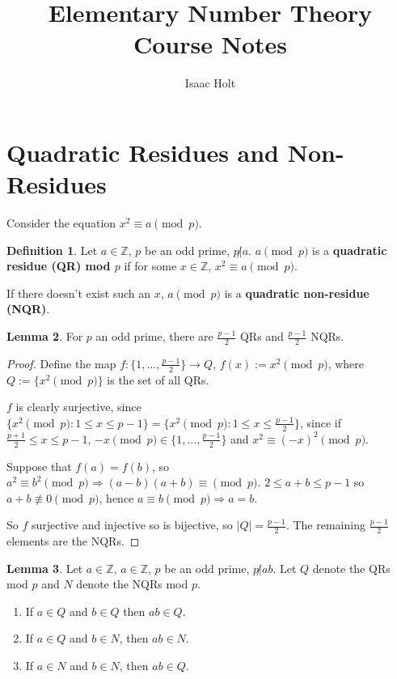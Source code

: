 \documentclass[12pt,a4paper]{article}
\title{Elementary Number Theory Course Notes}
\author{Isaac Holt}
\theoremstyle{definition}
\newtheorem{definition}{Definition}[subsection]
\newtheorem{lemma}[definition]{Lemma}
\begin{document}
\maketitle

\section{Quadratic Residues and Non-Residues}

Consider the equation $x^2 \equiv a \pmod{p}$.

\begin{definition}
	Let $a \in \mathbb{Z}$, $p$ be an odd prime, $p \not | a$. $a \pmod{p}$ is a \textbf{quadratic residue (QR) mod $p$} if for some $x \in \mathbb{Z}$, $x^2 \equiv a \pmod{p}$.

	If there doesn't exist such an $x$, $a \pmod{p}$ is a \textbf{quadratic non-residue (NQR)}.
\end{definition}

\begin{lemma}
	For $p$ an odd prime, there are $\frac{p - 1}{2}$ QRs and $\frac{p - 1}{2}$ NQRs.
\end{lemma}

\begin{proof}
	Define the map $f: \{1, \dots, \frac{p - 1}{2}\} \rightarrow Q$, $f(x) := x^2 \pmod{p}$, where $Q := \{x^2 \pmod{p}\}$ is the set of all QRs.

	$f$ is clearly surjective, since $\{x^2 \pmod{p}: 1 \le x \le p - 1\} = \{x^2 \pmod{p}: 1 \le x \le \frac{p - 1}{2}\}$, since if $\frac{p + 1}{2} \le x \le p - 1$, $-x \pmod{p} \in \{1, \dots, \frac{p - 1}{2}\}$ and $x^2 \equiv (-x)^2 \pmod{p}$.

	Suppose that $f(a) = f(b)$, so $a^2 \equiv b^2 \pmod{p} \Rightarrow (a - b)(a + b) \equiv \pmod{p}$. $2 \le a + b \le p - 1$ so $a + b \not\equiv 0 \pmod{p}$, hence $a \equiv b \pmod{p} \Rightarrow a = b$.

	So $f$ surjective and injective so is bijective, so $|Q| = \frac{p - 1}{2}$. The remaining $\frac{p - 1}{2}$ elements are the NQRs.
\end{proof}

\begin{lemma}
	Let $a \in \mathbb{Z}$, $a \in \mathbb{Z}$, $p$ be an odd prime, $p \not| ab$. Let $Q$ denote the QRs mod $p$ and $N$ denote the NQRs mod $p$.

	\begin{enumerate}
		\item If $a \in Q$ and $b \in Q$ then $ab \in Q$.
		\item If $a \in Q$ and $b \in N$, then $ab \in N$.
		\item If $a \in N$ and $b \in N$, then $ab \in Q$.
	\end{enumerate}
\end{lemma}
\end{document}
